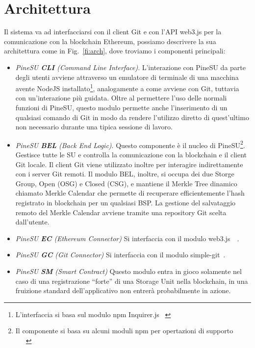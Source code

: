 \section {Architettura}
\indent
Il sistema va ad interfacciarsi con il client Git e con l’API \textsf{web3.js} per la comunicazione
con la blockchain Ethereum, possiamo descrivere la sua architettura come in Fig.~\ref{fi:arch}, dove troviamo i componenti principali:
\begin{itemize}
    \item \emph{PineSU \textbf{CLI} (Command Line Interface)}. L’interazione con PineSU da parte degli utenti avviene attraverso un emulatore di terminale di una macchina avente NodeJS installato\footnote{L’interfaccia si basa sul modulo npm Inquirer.js ~\cite{inquirer-github-21}}, analogamente a come avviene con Git, tuttavia con un’interazione più guidata. Oltre al permettere l’uso delle normali funzioni di PineSU, questo modulo permette anche l’inserimento di un qualsiasi comando di Git in modo da rendere l’utilizzo diretto di quest’ultimo non necessario durante una tipica sessione di lavoro.
    \item \emph{PineSU \textbf{BEL} (Back End Logic)}. Questo componente è il nucleo di PineSU\footnote{Il componente si basa su alcuni moduli npm per opertazioni di supporto ~\cite{adm-zip-github-21}~\cite{chalk-github-21}~\cite{merkle-tools-github-21}}. Gestisce tutte le SU e controlla la comunicazione con la blockchain e il client Git locale.
    Il client Git viene utilizzato inoltre per interagire indirettamente con i server Git remoti.
    Il modulo BEL, inoltre, si occupa dei due Storge Group, Open (OSG) e Closed (CSG), e
    mantiene il Merkle Tree dinamico chiamato Merkle Calendar che permette di recuperare efficientemente
    l’hash registrato in blockchain per un qualsiasi BSP. La gestione del salvataggio remoto del Merkle Calendar avviene tramite una repository Git scelta dall’utente.
    \item \emph{PineSU \textbf{EC} (Ethereum Connector)} Si interfaccia con il modulo \textsf{web3.js}~\cite{web3js-github-21}~\cite{web3js-doc-21}. 
    \item \emph{PineSU \textbf{GC} (Git Connector)} Si interfaccia con il modulo \textsf{simple-git}~\cite{simple-git-github-21}. 
    \item \emph{PineSU \textbf{SM} (Smart Contract)} Questo modulo entra in gioco solamente nel caso di una registrazione “forte” di una Storage Unit nella blockchain, in una fruizione standard dell’applicativo non entrerà probabilmente in azione.
\end{itemize}

